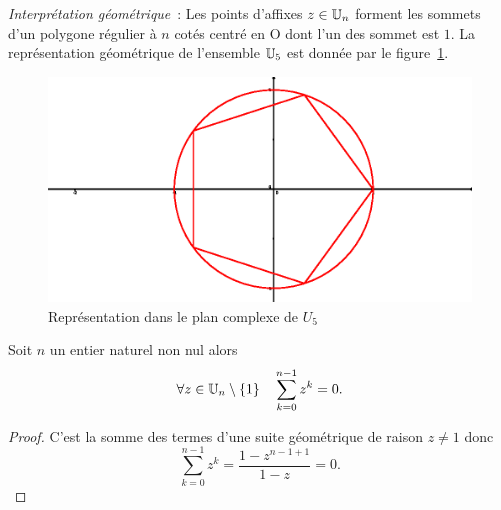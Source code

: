 \emph{Interprétation géométrique}~: Les points d'affixes $z \in \mathbb{U}_n$ forment les sommets d'un polygone régulier à $n$ cotés centré en O dont l'un des sommet est $1$. La représentation géométrique de l'ensemble $\mathbb{U}_5$ est donnée par le figure~\ref{fig:racinesnieme}.
\begin{figure}
  \centering
  \includegraphics[width=\textwidth, scale=1]{racines-nieme.eps}
  \caption{Représentation dans le plan complexe de $U_5$}
  \label{fig:racinesnieme}
\end{figure}

\begin{theo}
  Soit $n$ un entier naturel non nul alors 
  \begin{equation} 
    \forall z \in \mathbb{U}_n \setminus \{1\} \quad \sum_{k=0}^{n-1} z^k = 0.
  \end{equation}
\end{theo}
\begin{proof} 
  C'est la somme des termes d'une suite géométrique de raison $z \neq 1$ donc 
  \begin{equation}
    \sum_{k=0}^{n-1} z^k = \frac{1-z^{n-1+1}}{1-z} = 0.
  \end{equation}
\end{proof}

